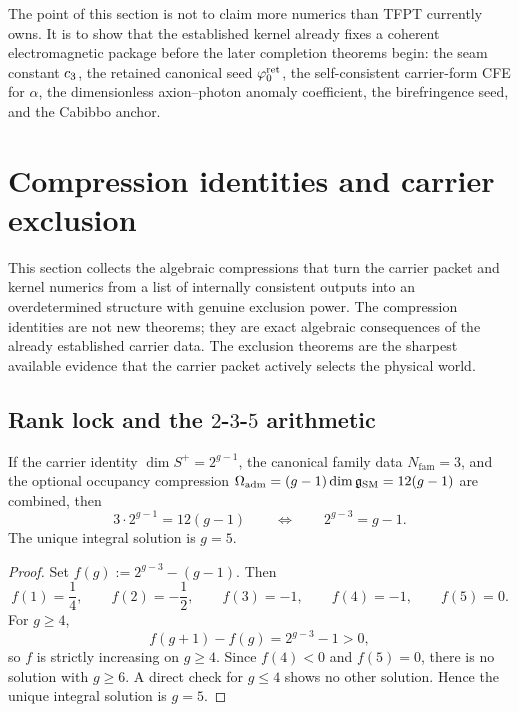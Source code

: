 \begin{tcolorbox}[colback=tfptblue!3, colframe=tfptblue, breakable,
    title={Kernel-output package}, colbacktitle=tfptblue]
The point of this section is not to claim more numerics than TFPT currently owns. It is to show that the established kernel already fixes a coherent electromagnetic package before the later completion theorems begin: the seam constant $c_3$, the retained canonical seed $\varphi_0^{\mathrm{ret}}$, the self-consistent carrier-form CFE for $\alpha$, the dimensionless axion--photon anomaly coefficient, the birefringence seed, and the Cabibbo anchor.
\end{tcolorbox}

\section{Compression identities and carrier exclusion}

This section collects the algebraic compressions that turn the carrier packet and kernel numerics from a list of internally consistent outputs into an overdetermined structure with genuine exclusion power. The compression identities are not new theorems; they are exact algebraic consequences of the already established carrier data. The exclusion theorems are the sharpest available evidence that the carrier packet actively selects the physical world.

\subsection{Rank lock and the \texorpdfstring{$2$-$3$-$5$}{2-3-5} arithmetic}

\begin{proposition}
\label{prop:rank-lock}
If the carrier identity $\dim S^+=2^{g-1}$, the canonical family data $N_{\mathrm{fam}}=3$, and the optional occupancy compression $\Omega_{\mathrm{adm}}=(g-1)\dim\mathfrak g_{\mathrm{SM}}=12(g-1)$ are combined, then
\begin{equation}
\label{eq:rank-lock}
3\cdot 2^{g-1}=12(g-1)
\qquad\Longleftrightarrow\qquad
2^{g-3}=g-1.
\end{equation}
The unique integral solution is $g=5$.
\end{proposition}

\begin{proof}
Set $f(g):=2^{g-3}-(g-1)$. Then
\[
f(1)=\frac14,\qquad
f(2)=-\frac12,\qquad
f(3)=-1,\qquad
f(4)=-1,\qquad
f(5)=0.
\]
For $g\ge 4$,
\[
f(g+1)-f(g)=2^{g-3}-1>0,
\]
so $f$ is strictly increasing on $g\ge 4$. Since $f(4)<0$ and $f(5)=0$, there is no solution with $g\ge 6$. A direct check for $g\le 4$ shows no other solution. Hence the unique integral solution is $g=5$.
\end{proof}

